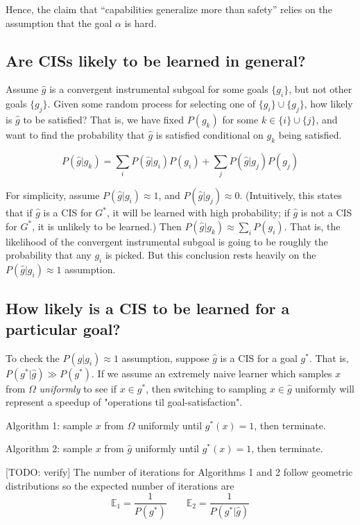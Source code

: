 \documentclass{article}
\begin{document}
Hence, the claim that ``capabilities generalize more than safety'' relies on the assumption that the goal $\alpha$ is hard.

\subsection{Are CISs likely to be learned in general?}\label{CIS-general}
Assume $\hat{g}$ is a convergent instrumental subgoal for some goals $\{g_i\}$, but not other goals $\{g_j\}$. Given some random process for selecting one of $\{g_i\} \cup \{g_j\}$, how likely is $\hat{g}$ to be satisfied? That is, we have fixed $P(g_k)$ for some $k \in \{i\} \cup \{j\}$, and want to find the probability that $\hat{g}$ is satisfied conditional on $g_k$ being satisfied.

\[
P(\hat{g}|g_k)=\sum_i P(\hat{g}|g_i)P(g_i) + \sum_j P(\hat{g}|g_j)P(g_j)
\]

For simplicity, assume $P(\hat{g}|g_i) \approx 1$, and $P(\hat{g}|g_j) \approx 0$. (Intuitively, this states that if $\hat{g}$ is a CIS for $G^*$, it will be learned with high probability; if $\hat{g}$ is not a CIS for $G^*$, it is unlikely to be learned.) Then $P(\hat{g}|g_k) \approx \sum_i P(g_i)$. That is, the likelihood of the convergent instrumental subgoal is going to be roughly the probability that any $g_i$ is picked. But this conclusion rests heavily on the $P(\hat{g}|g_i) \approx 1$ assumption.

\subsection{How likely is a CIS to be learned for a particular goal?}
To check the $P(\hat{g}|g_i) \approx 1$ assumption, suppose $\hat{g}$ is a CIS for a goal $g^*$. That is, $P(g^*|\hat{g})\gg P(g^*)$. If we assume an extremely naive learner which samples $x$ from $\Omega$ \textit{uniformly} to see if $x \in g^*$, then switching to sampling $x \in \hat{g}$ uniformly will represent a speedup of "operations til goal-satisfaction".

Algorithm 1: sample $x$ from $\Omega$ uniformly until $g^*(x)=1$, then terminate.

Algorithm 2: sample $x$ from $\hat{g}$ uniformly until $g^*(x)=1$, then terminate.

[TODO: verify] The number of iterations for Algorithms 1 and 2 follow geometric distributions so the expected number of iterations are 
\[
\mathbb{E}_1 = \frac{1}{P(g^*)} \qquad \mathbb{E}_2 = \frac{1}{P(g^*|\hat{g})}    
\]
\end{document}
